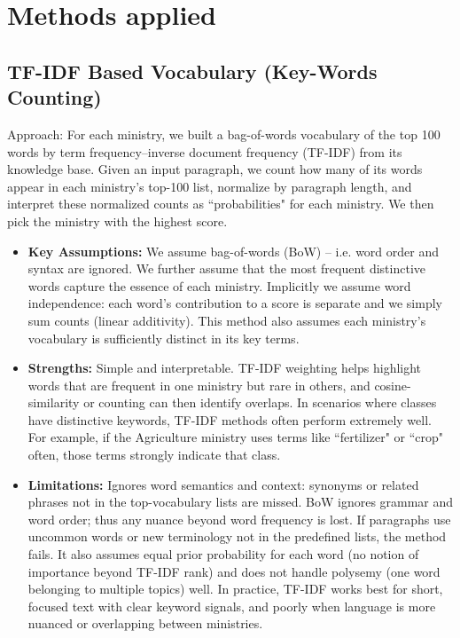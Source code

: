 \documentclass{report}
\begin{document}
\section{Methods applied}
\subsection{TF-IDF Based Vocabulary (Key-Words Counting)}
Approach: For each ministry, we built a bag-of-words vocabulary of the top 100 words by term frequency–inverse document frequency (TF-IDF) from its knowledge base. Given an input paragraph, we count how many of its words appear in each ministry's top-100 list, normalize by paragraph length, and interpret these normalized counts as ``probabilities" for each ministry. We then pick the ministry with the highest score.

\begin{itemize}
    \item \textbf{Key Assumptions:} We assume bag-of-words (BoW) – i.e. word order and syntax are ignored. We further assume that the most frequent distinctive words capture the essence of each ministry. Implicitly we assume word independence\cite{Robertson2004}: each word's contribution to a score is separate and we simply sum counts (linear additivity). This method also assumes each ministry's vocabulary is sufficiently distinct in its key terms.
    \item \textbf{Strengths:} Simple and interpretable. TF-IDF weighting helps highlight words that are frequent in one ministry but rare in others, and cosine-similarity or counting can then identify overlaps. In scenarios where classes have distinctive keywords, TF-IDF methods often perform extremely well. For example, if the Agriculture ministry uses terms like ``fertilizer" or ``crop" often, those terms strongly indicate that class.
    \item \textbf{Limitations:} Ignores word semantics and context: synonyms or related phrases not in the top-vocabulary lists are missed. BoW ignores grammar and word order; thus any nuance beyond word frequency is lost. If paragraphs use uncommon words or new terminology not in the predefined lists, the method fails. It also assumes equal prior probability for each word (no notion of importance beyond TF-IDF rank) and does not handle polysemy (one word belonging to multiple topics) well. In practice, TF-IDF works best for short, focused text with clear keyword signals, and poorly when language is more nuanced or overlapping between ministries.
\end{itemize}
\end{document}
